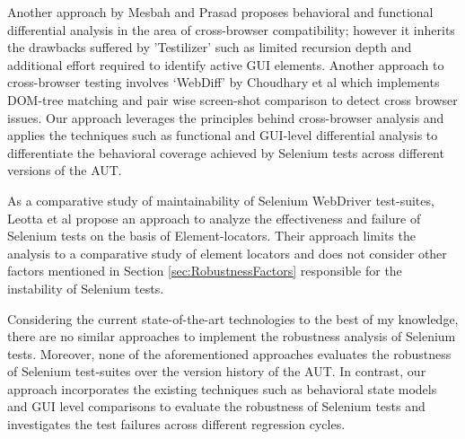 Another approach by Mesbah and Prasad \cite{CBCMesbah} proposes behavioral and functional differential analysis in the area of cross-browser compatibility; however it inherits the drawbacks suffered by 'Testilizer' such as limited recursion depth and additional effort required to identify active GUI elements. Another approach to cross-browser testing involves ‘WebDiff’ by Choudhary et al \cite{WebDiff} which implements DOM-tree matching and pair wise screen-shot comparison to detect cross browser issues. Our approach leverages the principles behind cross-browser analysis and applies the techniques such as functional and GUI-level differential analysis to differentiate the behavioral coverage achieved by Selenium tests across different versions of the AUT.

As a comparative study of maintainability of Selenium WebDriver test-suites, Leotta et al \cite{leotta2013comparing} propose an approach to analyze the effectiveness and failure of Selenium tests on the basis of Element-locators. Their approach limits the analysis to a comparative study of element locators and does not consider other factors mentioned in Section \ref{sec:RobustnessFactors} responsible for the instability of Selenium tests. 

Considering the current state-of-the-art technologies to the best of my knowledge, there are no similar approaches to implement the robustness analysis of Selenium tests. Moreover, none of the aforementioned approaches evaluates the robustness of Selenium test-suites over the version history of the AUT. In contrast, our approach incorporates the existing techniques such as behavioral state models and GUI level comparisons to evaluate the robustness of Selenium tests and investigates the test failures across different regression cycles.